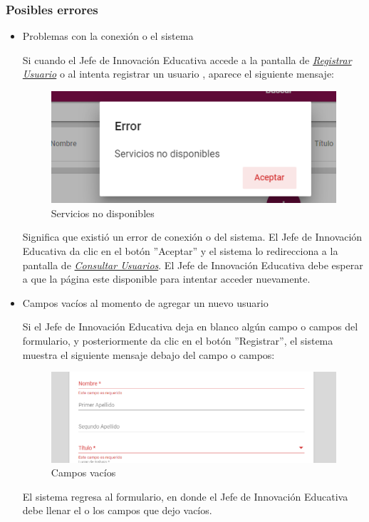 \subsubsection{Posibles errores}

\begin{itemize}
	\item Problemas con la conexión o el sistema

	Si cuando el Jefe de Innovación Educativa accede a la pantalla de \hyperlink{registrarUs-JIE}{\textit{Registrar Usuario}} o al intenta registrar un usuario , aparece el siguiente mensaje:

	\begin{figure}[H]
		\centering
		\includegraphics[width=0.4\linewidth]{images/SP5/MSGSN}
		\caption{Servicios no disponibles}
		\label{SND-JIE}

	\end{figure}

	Significa que existió un error de conexión o del sistema. El Jefe de Innovación Educativa da clic en el botón ''Aceptar'' y el sistema lo redirecciona  a la pantalla de \hyperlink{consultarUs-JIE}{\textit{Consultar Usuarios}}. El Jefe de Innovación Educativa debe esperar a que la página este disponible para intentar acceder nuevamente.

	\item Campos vacíos al momento de agregar un nuevo usuario

	Si el Jefe de Innovación Educativa deja en blanco algún campo o campos del formulario, y posteriormente da clic en el botón ''Registrar'', el sistema muestra el siguiente mensaje debajo del campo o campos:

	\begin{figure}[H]
		\centering
		\includegraphics[width=0.4\linewidth]{images/SP5/MSG44}
		\caption{Campos vacíos}
		\label{mensaje44-JIE}
	\end{figure}

	El sistema regresa al formulario, en donde el Jefe de Innovación Educativa debe llenar el o los campos que dejo vacíos.


\end{itemize}
